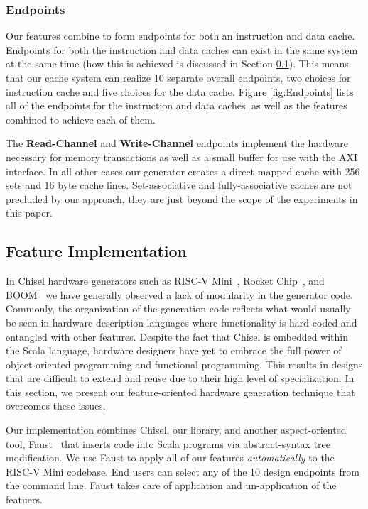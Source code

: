 \documentclass[conference]{IEEEtran}
\begin{document}
\subsubsection{Endpoints}

Our features combine to form endpoints for both an instruction and data cache. Endpoints for both the instruction and data caches can exist in the same system at the same time (how this is achieved is discussed in Section \ref{sec:implementation}). This means that our cache system can realize 10 separate overall endpoints, two choices for instruction cache and five choices for the data cache. Figure \ref{fig:Endpoints} lists all of the endpoints for the instruction and data caches, as well as the features combined to achieve each of them. 

The \textbf{Read-Channel} and \textbf{Write-Channel} endpoints implement the hardware necessary for memory transactions as well as a small buffer for use with the AXI interface. In all other cases our generator creates a direct mapped cache with 256 sets and 16 byte cache lines. Set-associative and fully-associative caches are not precluded by our approach, they are just beyond the scope of the experiments in this paper.

\subsection{Feature Implementation}\label{sec:implementation}
In Chisel hardware generators such as RISC-V Mini~\cite{RvMini}, Rocket Chip~\cite{chisel:riscv}, and BOOM~\cite{} we have generally observed a lack of modularity in the generator code. Commonly, the organization of the generation code reflects what would usually be seen in hardware description languages where functionality is hard-coded and entangled with other features. Despite the fact that Chisel is embedded within the Scala language, hardware designers have yet to embrace the full power of object-oriented programming and functional programming. This results in designs that are difficult to extend and reuse due to their high level of specialization. In this section, we present our feature-oriented hardware generation technique that overcomes these issues.

Our implementation combines Chisel, our library, and another aspect-oriented tool, Faust~\cite{Deters:21} that inserts code into Scala programs via abstract-syntax tree modification. We use Faust to apply all of our features \emph{automatically} to the RISC-V Mini codebase. End users can select any of the 10 design endpoints from the command line. Faust takes care of application and un-application of the featuers.
\end{document}
